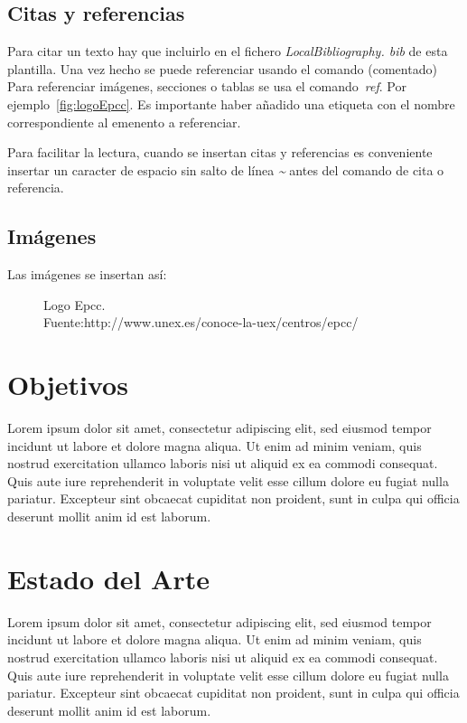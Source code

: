 \section{Citas y referencias}
Para citar un texto hay que incluirlo en el fichero \textit{LocalBibliography.
bib} de esta plantilla.
Una vez hecho se puede referenciar usando el comando (comentado) %
Para referenciar imágenes, secciones o tablas se usa el comando~\textit{ref}.
Por ejemplo~\autoref{fig:logoEpcc}.
Es importante haber añadido una etiqueta con el nombre correspondiente al emenento a referenciar.
\par
Para facilitar la lectura, cuando se insertan citas y referencias es conveniente insertar un caracter de espacio sin salto de línea \textit{\~} antes del comando de cita o referencia.


\section{Imágenes}
Las imágenes se insertan así:

\begin{figure}[H]
\centering

\caption[Logo Epcc]{Logo Epcc.\\Fuente:http://www.unex.es/conoce-la-uex/centros/epcc/}
\label{fig:logoEpcc}
\end{figure}


\chapter{Objetivos}
Lorem ipsum dolor sit amet, consectetur adipiscing elit, sed eiusmod tempor incidunt ut labore et dolore magna aliqua.
Ut enim ad minim veniam, quis nostrud exercitation ullamco laboris nisi ut aliquid ex ea commodi consequat.
Quis aute iure reprehenderit in voluptate velit esse cillum dolore eu fugiat nulla pariatur.
Excepteur sint obcaecat cupiditat non proident, sunt in culpa qui officia deserunt mollit anim id est laborum.

\chapter{Estado del Arte}
Lorem ipsum dolor sit amet, consectetur adipiscing elit, sed eiusmod tempor incidunt ut labore et dolore magna aliqua.
Ut enim ad minim veniam, quis nostrud exercitation ullamco laboris nisi ut aliquid ex ea commodi consequat.
Quis aute iure reprehenderit in voluptate velit esse cillum dolore eu fugiat nulla pariatur.
Excepteur sint obcaecat cupiditat non proident, sunt in culpa qui officia deserunt mollit anim id est laborum.

